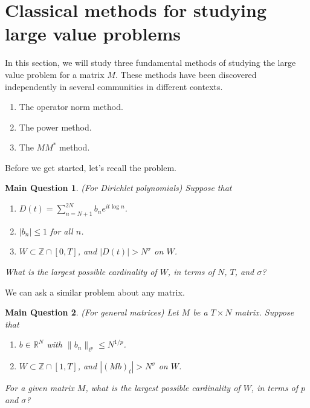 \documentclass{amsart}
\newtheorem*{mainques}{Main Question}
\newcommand{\ZZ}{\mathbb{Z}}
\newcommand{\RR}{\mathbb{R}}
\begin{document}
\section{Classical methods for studying large value problems} \label{secclassmeth}

In this section,  we will study three fundamental methods of studying the large value problem for a matrix $M$.  These methods have been discovered independently in several communities in different contexts.  

\begin{enumerate}

\item The operator norm method.

\item The power method.

\item The $M M^*$ method.

\end{enumerate}

Before we get started, let's recall the problem.  

\begin{mainques} (For Dirichlet polynomials) Suppose that

\begin{enumerate}

\item $D(t) = \sum_{n=N+1}^{2N} b_n e^{i t \log n}$.

\item $|b_n| \le 1$ for all $n$.

\item $W \subset \ZZ \cap [0,T]$, and $|D(t)| > N^\sigma$ on $W$.  

\end{enumerate}

What is the largest possible cardinality of $W$, in terms of $N$, $T$, and $\sigma$?
\end{mainques}

We can ask a similar problem about any matrix.  

\begin{mainques} (For general matrices) Let $M$ be a $T \times N$ matrix.   Suppose that

\begin{enumerate}

\item $b \in \RR^N$ with $\| b_n \|_{\ell^p} \le N^{1/p}$.  

\item $W \subset \ZZ \cap [1,T]$, and $|(Mb)_t| > N^\sigma$ on $W$.  

\end{enumerate}

For a given matrix $M$,  what is the largest possible cardinality of $W$, in terms of $p$ and $\sigma$?
\end{mainques}
\end{document}
